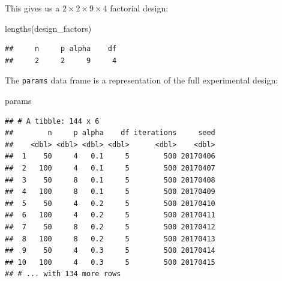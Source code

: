 \documentclass[
]{book}
\newenvironment{Shaded}{\begin{snugshade}}{\end{snugshade}}
\newcommand{\AttributeTok}[1]{\textcolor[rgb]{0.77,0.63,0.00}{#1}}
\newcommand{\CommentTok}[1]{\textcolor[rgb]{0.56,0.35,0.01}{\textit{#1}}}
\newcommand{\DecValTok}[1]{\textcolor[rgb]{0.00,0.00,0.81}{#1}}
\newcommand{\FloatTok}[1]{\textcolor[rgb]{0.00,0.00,0.81}{#1}}
\newcommand{\FunctionTok}[1]{\textcolor[rgb]{0.00,0.00,0.00}{#1}}
\newcommand{\NormalTok}[1]{#1}
\newcommand{\OtherTok}[1]{\textcolor[rgb]{0.56,0.35,0.01}{#1}}
\newcommand{\SpecialCharTok}[1]{\textcolor[rgb]{0.00,0.00,0.00}{#1}}
\begin{document}
\begin{Shaded}
\end{Shaded}

This gives us a \(2\times2\times9\times4\) factorial design:

\begin{Shaded}
\begin{Highlighting}[]
\FunctionTok{lengths}\NormalTok{(design\_factors)}
\end{Highlighting}
\end{Shaded}

\begin{verbatim}
##     n     p alpha    df 
##     2     2     9     4
\end{verbatim}

The \texttt{params} data frame is a representation of the full experimental design:

\begin{Shaded}
\begin{Highlighting}[]
\NormalTok{params}
\end{Highlighting}
\end{Shaded}

\begin{verbatim}
## # A tibble: 144 x 6
##        n     p alpha    df iterations     seed
##    <dbl> <dbl> <dbl> <dbl>      <dbl>    <dbl>
##  1    50     4   0.1     5        500 20170406
##  2   100     4   0.1     5        500 20170407
##  3    50     8   0.1     5        500 20170408
##  4   100     8   0.1     5        500 20170409
##  5    50     4   0.2     5        500 20170410
##  6   100     4   0.2     5        500 20170411
##  7    50     8   0.2     5        500 20170412
##  8   100     8   0.2     5        500 20170413
##  9    50     4   0.3     5        500 20170414
## 10   100     4   0.3     5        500 20170415
## # ... with 134 more rows
\end{verbatim}
\end{document}
